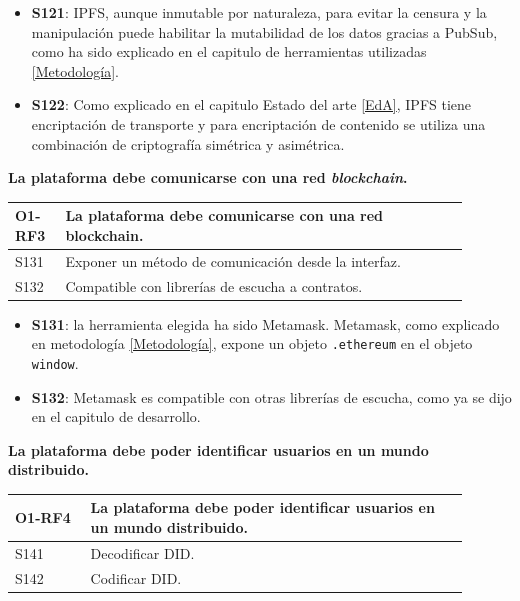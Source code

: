 \begin{itemize}
    \item \textbf{S121}: IPFS, aunque inmutable por naturaleza, para evitar la censura y la manipulación puede habilitar la mutabilidad de los datos gracias a PubSub, como ha sido explicado en el capitulo de herramientas utilizadas \ref{Metodología}.
    \item \textbf{S122}: Como explicado en el capitulo Estado del arte \ref{EdA}, IPFS tiene encriptación de transporte y para encriptación de contenido se utiliza una combinación de criptografía simétrica y asimétrica.
\end{itemize}
\textbf{La plataforma debe comunicarse con una red \textit{blockchain}.}
\begin{center}
    \begin{table}[h!]
        \begin{tabular}{|p{0.1\linewidth} | p{0.8\linewidth}|}
            \hline
             
            \textbf{O1-RF3} & \textbf{La plataforma debe comunicarse con una red blockchain.} \\
            \hline
            S131            & Exponer un método de comunicación desde la interfaz. \\
            \hline
            S132            & Compatible con librerías de escucha a contratos. \\
            \hline
        \end{tabular}
    \end{table}
\end{center}
\begin{itemize}
    \item \textbf{S131}: la herramienta elegida ha sido Metamask. Metamask, como explicado en metodología \ref{Metodología}, expone un objeto \verb|.ethereum| en el objeto \verb|window|.
    \item \textbf{S132}: Metamask es compatible con otras librerías de escucha, como ya se dijo en el capitulo de desarrollo.
\end{itemize}
\textbf{La plataforma debe poder identificar usuarios en un mundo distribuido.}
\begin{center}
    \begin{table}[h!]
        \begin{tabular}{|p{0.15\linewidth} | p{0.75\linewidth}|}
            \hline
             
            \textbf{O1-RF4} & \textbf{La plataforma debe poder identificar usuarios en un mundo distribuido.} \\
            \hline
            S141            & Decodificar DID. \\
            \hline
            S142            & Codificar DID. \\
            \hline
        \end{tabular}
    \end{table}
\end{center}
